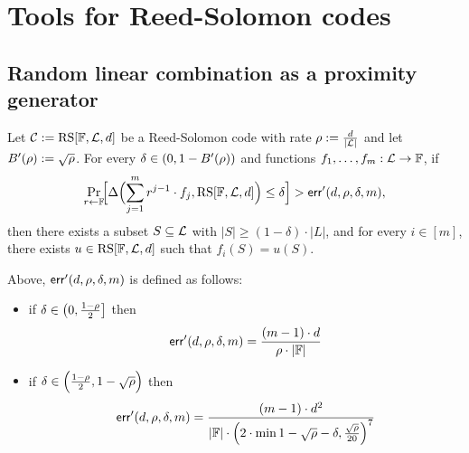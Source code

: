 \chapter{Tools for Reed-Solomon codes}

\section{Random linear combination as a proximity generator}\label{sec:proximity_gap}


\begin{theorem}\label{thm:proximity_gap}
\leanok
{}
    Let $\mathcal{C} := \mathrm{RS}[\mathbb{F},\mathcal{L},d]$ be a Reed-Solomon code with rate $\rho:=\frac{d}{|\mathcal{L}|}$ and let $B'(\rho):=\sqrt{\rho}$. For every $\delta \in (0,1 - B'(\rho))$ and functions $f_1,\ldots,f_m : \mathcal{L} \to \mathbb{F}$, if
    \[
    \Pr_{r\leftarrow\mathbb{F}}\!\Bigl[
      \Delta\Bigl(\sum_{j=1}^m r^{j - 1}\cdot {f_j},\mathrm{RS}[\mathbb{F},\mathcal{L},d]\Bigr)
      \le \delta
    \Bigr]>\mathsf{err}'(d,\rho,\delta,m),
    \]
    then there exists a subset $S \subseteq \mathcal{L}$ with $|S| \ge (1 - \delta)\cdot|L|$,
    and for every $i \in [m]$, there exists $u \in \mathrm{RS}[\mathbb{F},\mathcal{L},d]$ such that $f_i(S) = u(S)$.
    
    \medskip
    
    \noindent
    Above, $\mathsf{err}'(d,\rho,\delta,m)$ is defined as follows:
    \begin{itemize}
        \item if $\delta \in \left(0,\frac{1-\rho}{2}\right]$ then
            \[
                \mathsf{err}'(d,\rho,\delta,m)=\frac{(m-1)\cdot d}{\rho\cdot|\mathbb{F}|}
            \]
        \item if $\delta \in \Bigl(\frac{1-\rho}{2}, 1-\sqrt{\rho}\Bigr)$ then
        \[
            \mathsf{err}'(d,\rho,\delta,m)=\frac{(m-1)\cdot {d}^2}{|\mathbb{F}|\cdot{\Bigl(2\cdot\min{1-\sqrt{\rho}-\delta,\frac{\sqrt{\rho}}{20}}\Bigr)}^7}
        \]
    \end{itemize}
    \end{theorem}
    